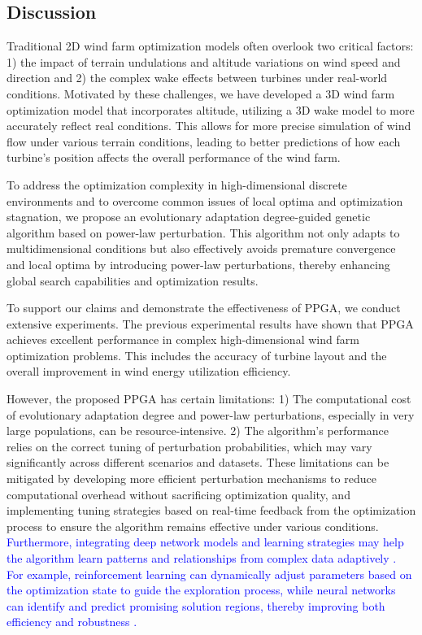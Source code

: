 \documentclass[journal,twoside]{IEEEtran}
\begin{document}
\subsection{Discussion}
Traditional 2D wind farm optimization models often overlook two critical factors: 1) the impact of terrain undulations and altitude variations on wind speed and direction and 2) the complex wake effects between turbines under real-world conditions. Motivated by these challenges, we have developed a 3D wind farm optimization model that incorporates altitude, utilizing a 3D wake model to more accurately reflect real conditions. This allows for more precise simulation of wind flow under various terrain conditions, leading to better predictions of how each turbine's position affects the overall performance of the wind farm.

To address the optimization complexity in high-dimensional discrete environments and to overcome common issues of local optima and optimization stagnation, we propose an evolutionary adaptation degree-guided genetic algorithm based on power-law perturbation. This algorithm not only adapts to multidimensional conditions but also effectively avoids premature convergence and local optima by introducing power-law perturbations, thereby enhancing global search capabilities and optimization results.

To support our claims and demonstrate the effectiveness of PPGA, we conduct extensive experiments. The previous experimental results have shown that PPGA achieves excellent performance in complex high-dimensional wind farm optimization problems. This includes the accuracy of turbine layout and the overall improvement in wind energy utilization efficiency.

However, the proposed PPGA has certain limitations: 1) The computational cost of evolutionary adaptation degree and power-law perturbations, especially in very large populations, can be resource-intensive. 2) The algorithm's performance relies on the correct tuning of perturbation probabilities, which may vary significantly across different scenarios and datasets. These limitations can be mitigated by developing more efficient perturbation mechanisms to reduce computational overhead without sacrificing optimization quality, and implementing tuning strategies based on real-time feedback from the optimization process to ensure the algorithm remains effective under various conditions. \textcolor{blue}{Furthermore, integrating deep network models and learning strategies may help the algorithm learn patterns and relationships from complex data adaptively \cite{8948246}. For example, reinforcement learning can dynamically adjust parameters based on the optimization state to guide the exploration process, while neural networks can identify and predict promising solution regions, thereby improving both efficiency and robustness \cite{9043894,9426596}.}
\end{document}
